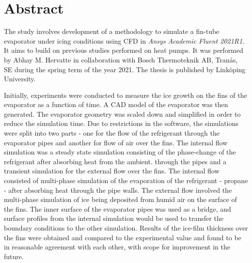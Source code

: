 \documentclass[11pt,a4paper,twoside,oneside]{article}
\begin{document}

\cleardoublepage
\thispagestyle{plain}

\section*{Abstract}

\vspace{.6cm}

The study involves development of a methodology to simulate a fin-tube evaporator under icing conditions using CFD in \emph{Ansys{\textregistered} Academic Fluent 2021R1}\cite{flug}. It aims to build on previous studies performed on heat pumps. It was performed by Abhay M. Hervatte in collaboration with Bosch Thermoteknik AB, Tran\aa s, SE during the spring term of the year 2021. The thesis is published by Link\"oping University.

Initially, experiments were conducted to measure the ice growth on the fins of the evaporator as a function of time. A CAD model of the evaporator was then generated. The evaporator geometry was scaled down and simplified in order to reduce the simulation time. Due to restrictions in the software, the simulations were split into two parts - one for the flow of the refrigerant through the evaporator pipes and another for flow of air over the fins. The internal flow simulation was a steady state simulation consisting of the phase-change of the refrigerant after absorbing heat from the ambient. through the pipes and a transient simulation for the external flow over the fins. The internal flow consisted of multi-phase simulation of the evaporation of the refrigerant - propane - after absorbing heat through the pipe walls. The external flow involved the multi-phase simulation of ice being deposited from humid air on the surface of the fins. The inner surface of the evaporator pipes was used as a bridge, and surface profiles from the internal simulation would be used to transfer the boundary conditions to the other simulation. Results of the ice-film thickness over the fins were obtained and compared to the experimental value and found to be in reasonable agreement with each other, with scope for improvement in the future.

\cleardoublepage
\end{document}
